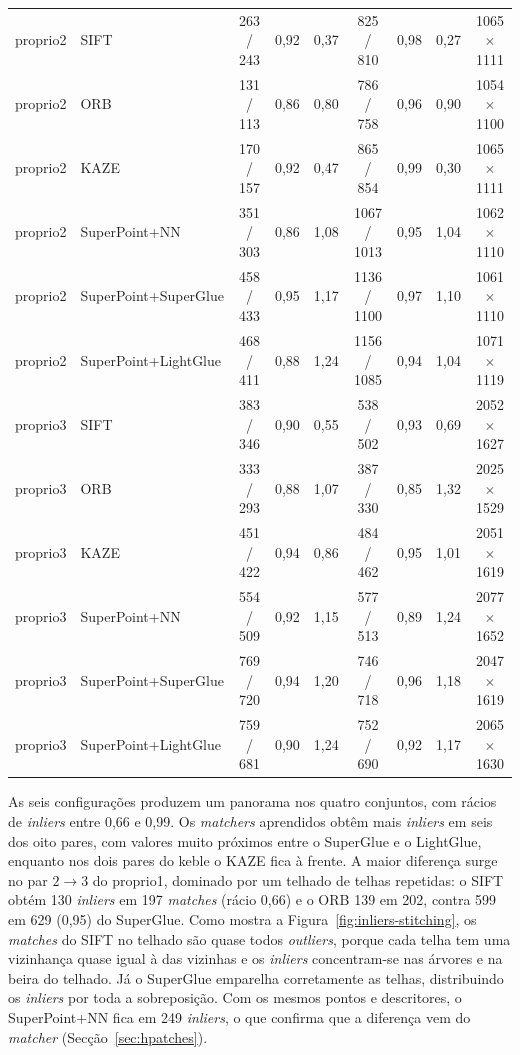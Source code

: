 \documentclass[11pt,a4paper]{article}
\begin{document}
\begin{table}[H]
\begin{tabular}{llccccccc}
\midrule
proprio2 & SIFT & 263 / 243 & 0,92 & 0,37 & 825 / 810 & 0,98 & 0,27 & 1065$\times$1111 \\
proprio2 & ORB & 131 / 113 & 0,86 & 0,80 & 786 / 758 & 0,96 & 0,90 & 1054$\times$1100 \\
proprio2 & KAZE & 170 / 157 & 0,92 & 0,47 & 865 / 854 & 0,99 & 0,30 & 1065$\times$1111 \\
proprio2 & SuperPoint+NN & 351 / 303 & 0,86 & 1,08 & 1067 / 1013 & 0,95 & 1,04 & 1062$\times$1110 \\
proprio2 & SuperPoint+SuperGlue & 458 / 433 & 0,95 & 1,17 & 1136 / 1100 & 0,97 & 1,10 & 1061$\times$1110 \\
proprio2 & SuperPoint+LightGlue & 468 / 411 & 0,88 & 1,24 & 1156 / 1085 & 0,94 & 1,04 & 1071$\times$1119 \\
\midrule
proprio3 & SIFT & 383 / 346 & 0,90 & 0,55 & 538 / 502 & 0,93 & 0,69 & 2052$\times$1627 \\
proprio3 & ORB & 333 / 293 & 0,88 & 1,07 & 387 / 330 & 0,85 & 1,32 & 2025$\times$1529 \\
proprio3 & KAZE & 451 / 422 & 0,94 & 0,86 & 484 / 462 & 0,95 & 1,01 & 2051$\times$1619 \\
proprio3 & SuperPoint+NN & 554 / 509 & 0,92 & 1,15 & 577 / 513 & 0,89 & 1,24 & 2077$\times$1652 \\
proprio3 & SuperPoint+SuperGlue & 769 / 720 & 0,94 & 1,20 & 746 / 718 & 0,96 & 1,18 & 2047$\times$1619 \\
proprio3 & SuperPoint+LightGlue & 759 / 681 & 0,90 & 1,24 & 752 / 690 & 0,92 & 1,17 & 2065$\times$1630 \\
\bottomrule
\end{tabular}
\end{table}

As seis configurações produzem um panorama nos quatro conjuntos, com rácios de \textit{inliers} entre 0,66 e 0,99. Os \textit{matchers} aprendidos obtêm mais \textit{inliers} em seis dos oito pares, com valores muito próximos entre o SuperGlue e o LightGlue, enquanto nos dois pares do keble o KAZE fica à frente. A maior diferença surge no par $2\to3$ do proprio1, dominado por um telhado de telhas repetidas: o SIFT obtém 130 \textit{inliers} em 197 \textit{matches} (rácio 0,66) e o ORB 139 em 202, contra 599 em 629 (0,95) do SuperGlue. Como mostra a Figura~\ref{fig:inliers-stitching}, os \textit{matches} do SIFT no telhado são quase todos \textit{outliers}, porque cada telha tem uma vizinhança quase igual à das vizinhas e os \textit{inliers} concentram-se nas árvores e na beira do telhado. Já o SuperGlue emparelha corretamente as telhas, distribuindo os \textit{inliers} por toda a sobreposição. Com os mesmos pontos e descritores, o SuperPoint+NN fica em 249 \textit{inliers}, o que confirma que a diferença vem do \textit{matcher} (Secção~\ref{sec:hpatches}).
\end{document}
